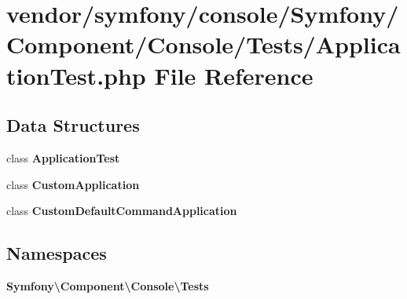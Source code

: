 \section{vendor/symfony/console/\+Symfony/\+Component/\+Console/\+Tests/\+Application\+Test.php File Reference}
\label{_application_test_8php}
\subsection*{Data Structures}
\begin{DoxyCompactItemize}
\item 
class {\bf Application\+Test}
\item 
class {\bf Custom\+Application}
\item 
class {\bf Custom\+Default\+Command\+Application}
\end{DoxyCompactItemize}
\subsection*{Namespaces}
\begin{DoxyCompactItemize}
\item 
 {\bf Symfony\textbackslash{}\+Component\textbackslash{}\+Console\textbackslash{}\+Tests}
\end{DoxyCompactItemize}
